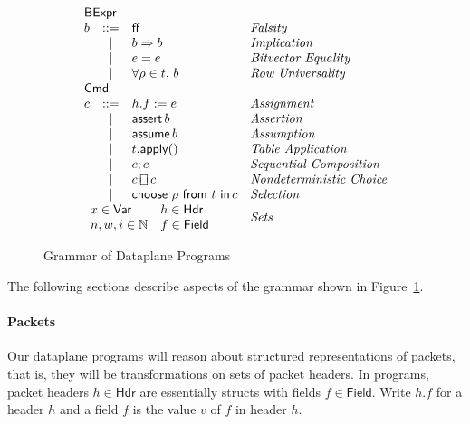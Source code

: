 \documentclass{article}
\newcommand{\FALSE}{\mathsf{ff}}
\newcommand{\BExpr}{\mathsf{BExpr}}
\newcommand{\Cmd}{\mathsf{Cmd}}
\newcommand{\Hdr}{\mathsf{Hdr}}
\newcommand{\Field}{\mathsf{Field}}
\newcommand{\Var}{\mathsf{Var}}
\newcommand{\assert}{\mathop{\mathsf{assert}}}
\newcommand{\assume}{\mathop{\mathsf{assume}}}
\newcommand{\apply}{\mathsf{apply}}
\newcommand{\choiceop}{\rotatebox[origin=c]{90}{$\sqsubset\!\!\!\sqsupset$}}
\newcommand{\choice}{\mathbin{\choiceop}}
\renewcommand{\choose}[2]{\mathop{\mathsf{choose}~#1~\mathsf{from}~#2~\mathsf{in}}}
\begin{document}
\begin{figure}[htp]
\[\begin{array}{lcll}
    \multicolumn{3}{l}{\BExpr} \\
    b & ::= & \FALSE  & \textit{Falsity}\\
      & \mid & b \Rightarrow b & \textit{Implication} \\
      & \mid & e = e & \textit{Bitvector Equality}\\
    & \mid & \forall \rho \in t.~b & \textit{Row Universality}\\
    \multicolumn{3}{l}{\Cmd} \\
    c & ::=  & h.f := e & \textit{Assignment}\\
      & \mid & \assert b & \textit{Assertion}\\
      & \mid & \assume b & \textit{Assumption}\\
      & \mid & t.\apply() & \textit{Table Application}\\
      & \mid & c;c & \textit{Sequential Composition} \\
    & \mid & c \choice c & \textit{Nondeterministic Choice}\\
    & \mid & \choose \rho t c & \textit{Selection} \\
    \multicolumn{3}{l}{
      \begin{array}{ll}
        x \in \Var & h \in \Hdr\\
        n,w,i \in \mathbb{N} & f \in \Field
    \end{array}} & \textit{Sets }\\
  \end{array}
\]
\caption{Grammar of Dataplane Programs}
\label{fig:grammar}
\end{figure}

The following sections describe aspects of the grammar shown in Figure~\ref{fig:grammar}.

\paragraph{Packets}
Our dataplane programs will reason about structured representations of packets,
that is, they will be transformations on sets of packet headers. In programs,
packet headers $h \in \Hdr$ are essentially structs with fields $f \in
\Field$. Write $h.f$ for a header $h$ and a field $f$ is the value $v$ of $f$
in header $h$.
\end{document}
